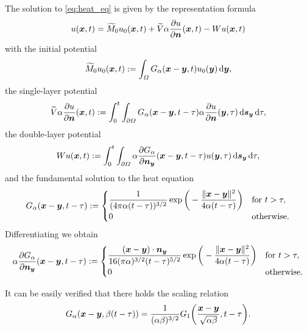 \documentclass[a4paper,11pt]{article}
\begin{document}
The solution to \eqref{eq:heat_eq} is given by the representation formula
\begin{equation}
  \label{eq:repr}
  u({{\bm{x}}},t) = \widetilde{M}_0 u_0({{\bm{x}}},t) + \widetilde V \alpha\frac{\partial u}{\partial {\ensuremath{{\bm{n}}}}}({{\bm{x}}},t) - Wu({{\bm{x}}},t)
\end{equation}
with the initial potential
\begin{equation*}
  \widetilde{M}_0 u_0({{\bm{x}}},t) := \int_\Omega G_\alpha({{\bm{x}}}-{{\bm{y}}},t) u_0({{\bm{y}}}) \,{\mathrm{d}}{{\bm{y}}},
\end{equation*}
the single-layer potential
\begin{equation*}
  \widetilde V \alpha\frac{\partial u}{\partial {\ensuremath{{\bm{n}}}}} ({{\bm{x}}},t) := \int_0^t \int_{\partial\Omega} G_\alpha({{\bm{x}}}-{{\bm{y}}},t-\tau) \alpha\frac{\partial u}{\partial {\ensuremath{{\bm{n}}}}} ({{\bm{y}}},\tau) \,{\mathrm{d}}{{\bm{s}}}_{{\bm{y}}} \,{\mathrm{d}}\tau,
\end{equation*}
the double-layer potential
\begin{equation*}
  W u ({{\bm{x}}},t) := \int_0^t \int_{\partial\Omega} \alpha\frac{\partial G_\alpha}{\partial {\ensuremath{{\bm{n}}}}_{{\bm{y}}}}({{\bm{x}}}-{{\bm{y}}},t-\tau) u({{\bm{y}}},\tau) \,{\mathrm{d}}{{\bm{s}}}_{{\bm{y}}} \,{\mathrm{d}}\tau,
\end{equation*}
and the fundamental solution to the heat equation
\begin{equation*}
  G_\alpha({{\bm{x}}}-{{\bm{y}}},t-\tau) :=
  \begin{cases}
  \displaystyle
  \frac{1}{(4\pi\alpha(t-\tau))^{3/2}}\exp\bigg( -\frac{\|{{\bm{x}}}-{{\bm{y}}}\|^2}{4\alpha(t-\tau)} \bigg) & \text{for } t > \tau, \\
  0 & \text{otherwise.}
  \end{cases}
\end{equation*}
Differentiating we obtain
\begin{equation*}
  \alpha\frac{\partial G_\alpha}{\partial {\ensuremath{{\bm{n}}}}_{{\bm{y}}}}({{\bm{x}}}-{{\bm{y}}},t-\tau) :=
  \begin{cases}
  \displaystyle
  \frac{({{\bm{x}}}-{{\bm{y}}})\cdot {\ensuremath{{\bm{n}}}}_{{\bm{y}}}}{16(\pi\alpha)^{3/2}(t-\tau)^{5/2}}\exp\bigg( -\frac{\|{{\bm{x}}}-{{\bm{y}}}\|^2}{4\alpha(t-\tau)} \bigg) & \text{for } t > \tau, \\
  0 & \text{otherwise.}
  \end{cases}
\end{equation*}  

\begin{remark}
  \label{rem:scaling}
  It can be easily verified that there holds the scaling relation
  \begin{equation}
  \label{eq:G_scaling}
    G_\alpha({{\bm{x}}}-{{\bm{y}}},\beta(t-\tau)) = \frac{1}{(\alpha\beta)^{3/2}} G_1\bigg( \frac{{{\bm{x}}}-{{\bm{y}}}}{\sqrt{\alpha\beta}}, t-\tau \bigg).
  \end{equation}
\end{remark}
\end{document}
